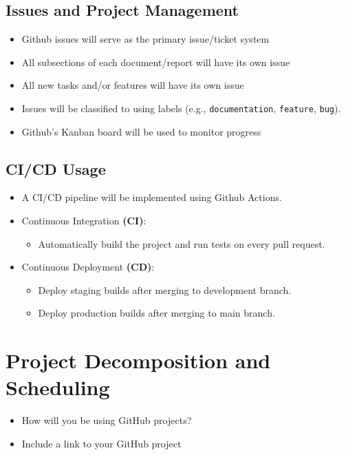 \documentclass{article}
\begin{document}
\subsection{Issues and Project Management}
\begin{itemize}
    \item Github issues will serve as the primary issue/ticket system
    \item All subsections of each document/report will have its own issue
    \item All new tasks and/or features will have its own issue
    \item Issues will be classified to using labels (e.g., \texttt{documentation}, \texttt{feature}, \texttt{bug}).
    \item Github's Kanban board will be used to monitor progress
\end{itemize}

\subsection{CI/CD Usage}
\begin{itemize}
    \item A CI/CD pipeline will be implemented using Github Actions.
    \item Continuous Integration \textbf{(CI)}:
    \begin{itemize}
        \item Automatically build the project and run tests on every pull request.
    \end{itemize}
    \item Continuous Deployment \textbf{(CD)}:
    \begin{itemize}
        \item Deploy staging builds after merging to development branch.
        \item Deploy production builds after merging to main branch.
    \end{itemize}
\end{itemize}

\section{Project Decomposition and Scheduling}

\begin{itemize}
  \item How will you be using GitHub projects?
  \item Include a link to your GitHub project
\end{itemize}
\end{document}
